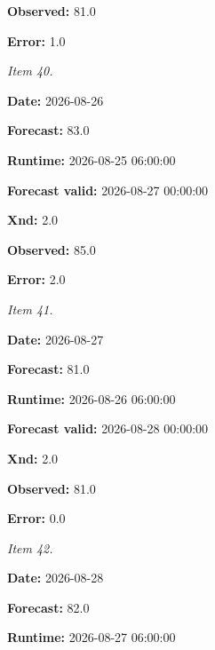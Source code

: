 \documentclass[11pt]{article}
\begin{document}
\par\noindent\textbf{Observed:} 81.0

\par\noindent\textbf{Error:} 1.0

\par\noindent\textit{Item 40.}\par \par\noindent\textbf{Date:} 2026-08-26

\par\noindent\textbf{Forecast:} 83.0

\par\noindent\textbf{Runtime:} 2026-08-25 06:00:00

\par\noindent\textbf{Forecast valid:} 2026-08-27 00:00:00

\par\noindent\textbf{Xnd:} 2.0

\par\noindent\textbf{Observed:} 85.0

\par\noindent\textbf{Error:} 2.0

\par\noindent\textit{Item 41.}\par \par\noindent\textbf{Date:} 2026-08-27

\par\noindent\textbf{Forecast:} 81.0

\par\noindent\textbf{Runtime:} 2026-08-26 06:00:00

\par\noindent\textbf{Forecast valid:} 2026-08-28 00:00:00

\par\noindent\textbf{Xnd:} 2.0

\par\noindent\textbf{Observed:} 81.0

\par\noindent\textbf{Error:} 0.0

\par\noindent\textit{Item 42.}\par \par\noindent\textbf{Date:} 2026-08-28

\par\noindent\textbf{Forecast:} 82.0

\par\noindent\textbf{Runtime:} 2026-08-27 06:00:00
\end{document}
